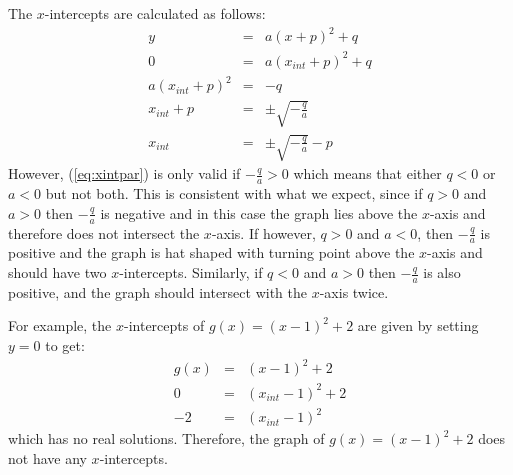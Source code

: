 {The $x$-intercepts are calculated as follows:
\begin{eqnarray}
y&=&a(x+p)^2+q\\
0&=&a(x_{int}+p)^2+q\\
a(x_{int}+p)^2&=&-q\\
x_{int}+p&=&\pm \sqrt{-\frac{q}{a}}\\
\label{eq:xintpar}
x_{int}&=&\pm \sqrt{-\frac{q}{a}}-p
\end{eqnarray}
However, (\ref{eq:xintpar}) is only valid if $-\frac{q}{a}>0$ which means that either $q<0$ or $a<0$ but not both. This is consistent with what we expect, since if $q>0$ and $a>0$ then $-\frac{q}{a}$ is negative and in this case the graph lies above the $x$-axis and therefore does not intersect the $x$-axis. If however, $q>0$ and $a<0$, then $-\frac{q}{a}$ is positive and the graph is hat shaped with turning point above the $x$-axis and should have two $x$-intercepts. Similarly, if $q<0$ and $a>0$ then $-\frac{q}{a}$ is also positive, and the graph should intersect with the $x$-axis twice.

For example, the $x$-intercepts of $g(x)=(x-1)^2 + 2$ are given by setting $y=0$ to get:
\begin{eqnarray*}
g(x)&=&(x-1)^2 + 2\\
0&=&(x_{int}-1)^2 + 2\\
-2&=&(x_{int}-1)^2
\end{eqnarray*}
which has no real solutions. Therefore, the graph of $g(x)=(x-1)^2 + 2$ does not have any $x$-intercepts.

}
